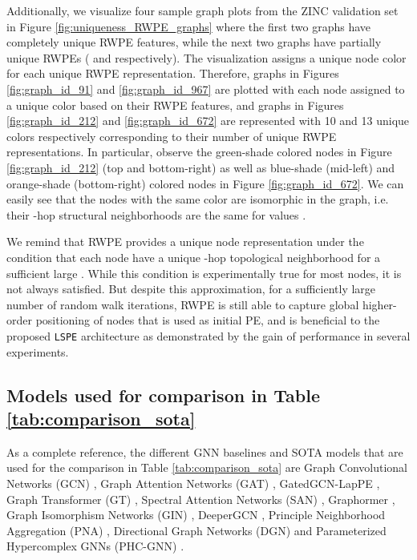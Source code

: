 \documentclass{article} \usepackage{iclr2021_conference,times}
\begin{document}
Additionally, we visualize four sample graph plots from the ZINC validation set in Figure \ref{fig:uniqueness_RWPE_graphs} where the first two graphs have completely unique RWPE features, while the next two graphs have partially unique RWPEs ( and  respectively). The visualization assigns a unique node color for each unique  RWPE representation. Therefore, graphs in Figures \ref{fig:graph_id_91} and \ref{fig:graph_id_967} are plotted with each node assigned to a unique color based on their RWPE features, and graphs in Figures \ref{fig:graph_id_212} and \ref{fig:graph_id_672} are represented with 10 and 13 unique colors respectively corresponding to their number of unique RWPE representations. In particular, observe the green-shade colored nodes in Figure \ref{fig:graph_id_212} (top and bottom-right) as well as blue-shade (mid-left) and orange-shade (bottom-right) colored nodes in Figure \ref{fig:graph_id_672}. We can easily see that the nodes with the same color are isomorphic in the graph, i.e. their -hop structural neighborhoods are the same for values . 


We remind that RWPE provides a unique node representation under the condition that each node have a unique -hop topological neighborhood for a sufficient large . While this condition is experimentally true for most nodes, it is not always satisfied. But despite this approximation, for a sufficiently large number  of random walk iterations, RWPE is still able to capture global higher-order positioning of nodes that is used as initial PE, and is beneficial to the proposed \texttt{LSPE} architecture as demonstrated by the gain of performance in several experiments. 





\subsection{Models used for comparison in Table \ref{tab:comparison_sota}}
\label{sec:models_comparison_sota}
As a complete reference, the different GNN baselines and SOTA models that are used for the comparison in Table \ref{tab:comparison_sota} are Graph Convolutional Networks (GCN) \citep{kipf2017semi}, Graph Attention Networks (GAT) \citep{velivckovic2018graph}, GatedGCN-LapPE \citep{bresson2017residual, dwivedi2020benchmarking}, Graph Transformer (GT) \citep{dwivedi2021generalization}, Spectral Attention Networks (SAN) \citep{kreuzer2021rethinking}, Graphormer \citep{ying2021transformers}, Graph Isomorphism Networks (GIN) \citep{xu2018how}, DeeperGCN \citep{li2020deepergcn}, Principle Neighborhood Aggregation (PNA) \citep{corso2020principal}, Directional Graph Networks (DGN) \citep{beani2021directional} and Parameterized Hypercomplex GNNs (PHC-GNN) \citep{le2021parameterized}.
\end{document}
